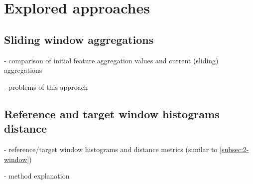 \chapter{Explored approaches} \label{chap:approaches} \minitoc

\section{Sliding window aggregations}
- comparison of initial feature aggregation values and current (sliding) aggregations

- problems of this approach

\section{Reference and target window histograms distance}
- reference/target window histograms and distance metrics (similar to \ref{subsec:2-window})

- method explanation


